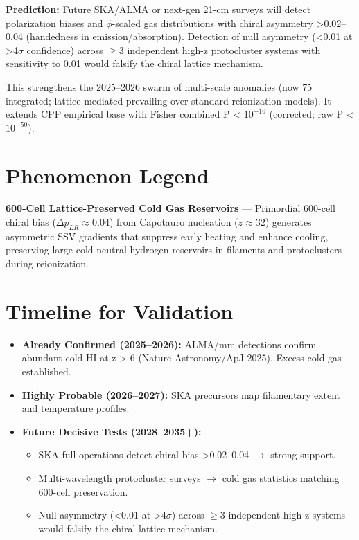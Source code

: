 \documentclass[11pt]{article}
\begin{document}
\textbf{Prediction:} Future SKA/ALMA or next-gen 21-cm surveys will detect polarization biases and $\phi$-scaled gas distributions with chiral asymmetry >0.02--0.04 (handedness in emission/absorption). Detection of null asymmetry (<0.01 at >4$\sigma$ confidence) across $\geq 3$ independent high-z protocluster systems with sensitivity to 0.01 would falsify the chiral lattice mechanism.

This strengthens the 2025--2026 swarm of multi-scale anomalies (now 75 integrated; lattice-mediated prevailing over standard reionization models). It extends CPP empirical base with Fisher combined P < $10^{-16}$ (corrected; raw P < $10^{-50}$).

\section{Phenomenon Legend}
\textbf{600-Cell Lattice-Preserved Cold Gas Reservoirs} — Primordial 600-cell chiral bias ($\Delta p_{LR} \approx 0.04$) from Capotauro nucleation ($z \approx 32$) generates asymmetric SSV gradients that suppress early heating and enhance cooling, preserving large cold neutral hydrogen reservoirs in filaments and protoclusters during reionization.

\section{Timeline for Validation}
\begin{itemize}
    \item \textbf{Already Confirmed (2025--2026):} ALMA/mm detections confirm abundant cold HI at z > 6 (Nature Astronomy/ApJ 2025). Excess cold gas established.
    \item \textbf{Highly Probable (2026--2027):} SKA precursors map filamentary extent and temperature profiles.
    \item \textbf{Future Decisive Tests (2028--2035+):}
    \begin{itemize}
        \item SKA full operations detect chiral bias >0.02--0.04 $\to$ strong support.
        \item Multi-wavelength protocluster surveys $\to$ cold gas statistics matching 600-cell preservation.
        \item Null asymmetry (<0.01 at >4$\sigma$) across $\geq 3$ independent high-z systems would falsify the chiral lattice mechanism.
    \end{itemize}
\end{itemize}
\end{document}
